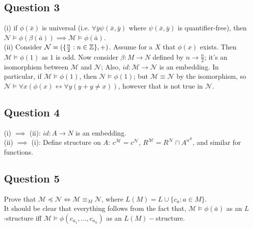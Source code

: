 \documentclass[a4paper]{article}
\begin{document}
\subsection{Question 3}
(i) if $\phi(\bar{x})$ is universal (i.e. $\forall \bar{y} \psi(\bar{x},\bar{y})$ where $\psi(\bar{x},\bar{y})$ is quantifier-free), then $\mathcal{N} \vDash \phi(\beta(\bar{a})) \implies \mathcal{M} \vDash \phi(\bar{a})$.\\
(ii) Consider $\mathcal{N} = (\{\frac{n}{2} : n \in \mathbb{Z} \},+)$. Assume for a $X$ that $\phi(x)$ exists. Then $\mathcal{M} \vDash \phi(1)$ as $1$ is odd. Now consider $\beta:M \to N$ defined by $n \to \frac{n}{2}$; it's an isomorphism between $\mathcal{M}$ and $\mathcal{N}$; Also, $id:\mathcal{M} \to \mathcal{N}$ is an embedding. In particular, if $\mathcal{M} \vDash \phi(1)$, then $\mathcal{N} \vDash \phi(1)$; but $\mathcal{M} \equiv \mathcal{N}$ by the isomorphism, so $\mathcal{N} \vDash \forall x (\phi(x) \leftrightarrow \forall y (y +y \neq x))$, however that is not true in $\mathcal{N}$.

\subsection{Question 4}
(i) $\implies$ (ii): $id: A \to N$ is an embedding.\\
(ii) $\implies$ (i): Define structure on $A$: $c^{\mathcal{M}} = c^{\mathcal{N}}$, $R^{\mathcal{M}} = R^{\mathcal{N}} \cap A^{n^R}$, and similar for functions.

\subsection{Question 5}
Prove that $\mathcal{M} \preccurlyeq \mathcal{N} \iff \mathcal{M} \equiv_M \mathcal{N}$, where $L(M) = L \cup \{c_a: a \in M\}$.\\
It should be clear that everything follows from the fact that, $\mathcal{M} \vDash \phi(\bar{a})$ as an $L$-structure iff $\mathcal{M} \vDash \phi(c_{a_1},...,c_{a_n})$ as an $L(M)-$structure.
\end{document}
